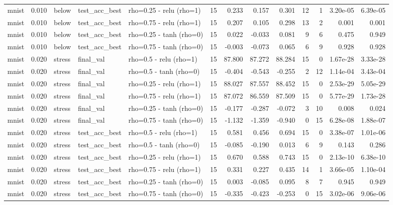 \begin{table}[htbp]
{\begin{tabular}{@{}lrlllrrrrrrrr@{}}
mnist & 0.010 & below & test\_acc\_best & rho=0.25 - relu (rho=1) & 15 & 0.233 & 0.157 & 0.301 & 12 & 1 & 3.20e-05 & 6.39e-05 \\
mnist & 0.010 & below & test\_acc\_best & rho=0.75 - relu (rho=1) & 15 & 0.207 & 0.105 & 0.298 & 13 & 2 & 0.001 & 0.001 \\
mnist & 0.010 & below & test\_acc\_best & rho=0.25 - tanh (rho=0) & 15 & 0.022 & -0.033 & 0.081 & 9 & 6 & 0.475 & 0.949 \\
mnist & 0.010 & below & test\_acc\_best & rho=0.75 - tanh (rho=0) & 15 & -0.003 & -0.073 & 0.065 & 6 & 9 & 0.928 & 0.928 \\
mnist & 0.020 & stress & final\_val & rho=0.5 - relu (rho=1) & 15 & 87.800 & 87.272 & 88.284 & 15 & 0 & 1.67e-28 & 3.33e-28 \\
mnist & 0.020 & stress & final\_val & rho=0.5 - tanh (rho=0) & 15 & -0.404 & -0.543 & -0.255 & 2 & 12 & 1.14e-04 & 3.43e-04 \\
mnist & 0.020 & stress & final\_val & rho=0.25 - relu (rho=1) & 15 & 88.027 & 87.557 & 88.452 & 15 & 0 & 2.53e-29 & 5.05e-29 \\
mnist & 0.020 & stress & final\_val & rho=0.75 - relu (rho=1) & 15 & 87.072 & 86.559 & 87.509 & 15 & 0 & 5.77e-29 & 1.73e-28 \\
mnist & 0.020 & stress & final\_val & rho=0.25 - tanh (rho=0) & 15 & -0.177 & -0.287 & -0.072 & 3 & 10 & 0.008 & 0.024 \\
mnist & 0.020 & stress & final\_val & rho=0.75 - tanh (rho=0) & 15 & -1.132 & -1.359 & -0.940 & 0 & 15 & 6.28e-08 & 1.88e-07 \\
mnist & 0.020 & stress & test\_acc\_best & rho=0.5 - relu (rho=1) & 15 & 0.581 & 0.456 & 0.694 & 15 & 0 & 3.38e-07 & 1.01e-06 \\
mnist & 0.020 & stress & test\_acc\_best & rho=0.5 - tanh (rho=0) & 15 & -0.085 & -0.190 & 0.013 & 6 & 9 & 0.143 & 0.286 \\
mnist & 0.020 & stress & test\_acc\_best & rho=0.25 - relu (rho=1) & 15 & 0.670 & 0.588 & 0.743 & 15 & 0 & 2.13e-10 & 6.38e-10 \\
mnist & 0.020 & stress & test\_acc\_best & rho=0.75 - relu (rho=1) & 15 & 0.331 & 0.227 & 0.435 & 14 & 1 & 3.66e-05 & 1.10e-04 \\
mnist & 0.020 & stress & test\_acc\_best & rho=0.25 - tanh (rho=0) & 15 & 0.003 & -0.085 & 0.095 & 8 & 7 & 0.945 & 0.949 \\
mnist & 0.020 & stress & test\_acc\_best & rho=0.75 - tanh (rho=0) & 15 & -0.335 & -0.423 & -0.253 & 0 & 15 & 3.02e-06 & 9.06e-06 \\

\end{tabular}}
\end{table}
